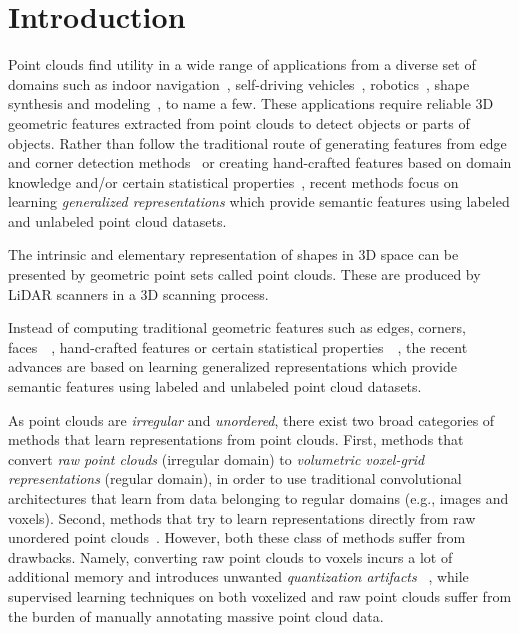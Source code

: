 \documentclass{article}
\begin{document}
\section{Introduction}
Point clouds find utility in a wide range of applications from a diverse set of domains such as indoor navigation~\cite{zhu2017target}, self-driving vehicles~\cite{liang2018deep}, robotics~\cite{rusu2008towards}, shape synthesis and modeling~\cite{golovinskiy2009shape}, to name a few. These applications require reliable $3$D geometric features extracted from point clouds to detect objects or parts of objects. Rather than follow the traditional route of generating features from edge and corner detection methods~\cite{guo20143d,lu2014recognizing} or creating hand-crafted features based on domain knowledge and/or certain statistical properties~\cite{rusu2008aligning,rusu2009fast}, recent methods focus on learning \emph{generalized representations} which provide semantic features using labeled and unlabeled point cloud datasets.

The intrinsic and elementary representation of shapes in 3D space can be presented by geometric point sets called point clouds. These are produced by LiDAR scanners in a 3D scanning process. 

 Instead of computing traditional geometric features such as edges, corners, faces~\cite{guo20143d}~\cite{lu2014recognizing}, hand-crafted features or certain statistical properties~\cite{rusu2008aligning}~\cite{rusu2009fast}, the recent advances are based on learning generalized representations which provide semantic features using labeled and unlabeled point cloud datasets. 
\fi
 
 As point clouds are \emph{irregular} and \emph{unordered}, there exist two broad categories of methods that learn representations from point clouds. 
 First, methods that convert \emph{raw point clouds} (irregular domain) to \emph{volumetric voxel-grid representations} (regular domain), in order to use traditional convolutional architectures that learn from data belonging to regular domains (e.g., images and voxels). 
 Second, methods that try to learn representations directly from raw unordered point clouds~\cite{dgcnn,qi2017pointnet,qi2017pointnet++,li2018pointcnn}. 
 However, both these class of methods suffer from drawbacks. Namely, converting raw point clouds to voxels incurs a lot of additional memory and introduces unwanted \emph{quantization artifacts} ~\cite{huang1998accurate}, while supervised learning techniques on both voxelized and raw point clouds suffer from the burden of manually annotating massive point cloud data.
\end{document}
